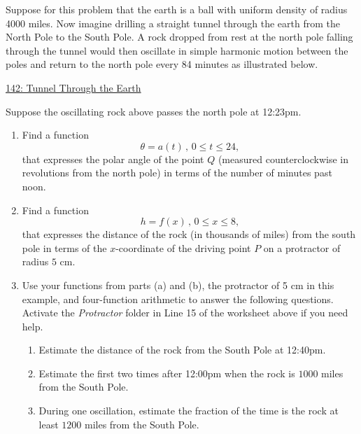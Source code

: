 \documentclass{ximera}
\begin{document}
\begin{example}  \label{Ex:FEfe344trgfd}

Suppose for this problem that the earth is a ball with uniform density of radius 4000 miles. Now imagine drilling a straight tunnel through the earth from the North Pole to the South Pole. A rock dropped from rest at the north pole falling through the tunnel would then oscillate in simple harmonic motion between the poles and return to the north pole every 84  minutes as illustrated below. %

\begin{onlineOnly}
    \begin{center}
\end{center}
\end{onlineOnly}

\href{https://www.desmos.com/calculator/z5ya8iy2e4}{142: Tunnel Through the Earth }

Suppose the oscillating rock above passes the north pole at 12:23pm.

\begin{enumerate}

\item Find a function
\[
   \theta = a(t) \, , \, 0\leq t \leq 24,
\]
that expresses the polar angle of the point $Q$ (measured counterclockwise in revolutions from the north pole) in terms of the number of minutes past noon. 

\item Find a function
\[
   h = f(x) \, , \, 0\leq x \leq 8,
\]
that expresses the distance of the rock (in thousands of miles) from the south pole in terms of the $x$-coordinate of the driving point $P$ on a protractor of radius $5$ cm. 

\item Use your functions from parts (a) and (b), the protractor of 5 cm in this example, and four-function arithmetic to answer the following questions. Activate the \emph{Protractor} folder in Line 15 of the worksheet above if you need help. 
\begin{enumerate}

\item Estimate the distance of the rock from the South Pole at 12:40pm.

\item Estimate the first two times after 12:00pm when the rock is $1000$ miles from the South Pole.

\item During one oscillation, estimate the fraction of the time is the rock at least $1200$ miles from the South Pole.
\end{enumerate}

\end{enumerate}
\end{example}
\end{document}
